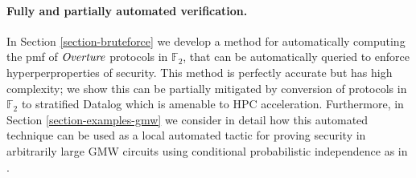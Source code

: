 \paragraph{Fully and partially automated verification.} In Section
\ref{section-bruteforce} we develop a method for automatically
computing the pmf of $\mathit{Overture}$ protocols in $\mathbb{F}_2$, that can
be automatically queried to enforce hyperperproperties of
security. This method is perfectly accurate but has high complexity;
we show this can be partially mitigated by conversion of protocols in
$\mathbb{F}_2$ to stratified Datalog which is amenable to HPC
acceleration. Furthermore, in Section \ref{section-examples-gmw} we
consider in detail how this automated technique can be used as a local
automated tactic for proving security in arbitrarily large GMW
circuits using conditional probabilistic independence as in
\cite{li2023lilac}.
